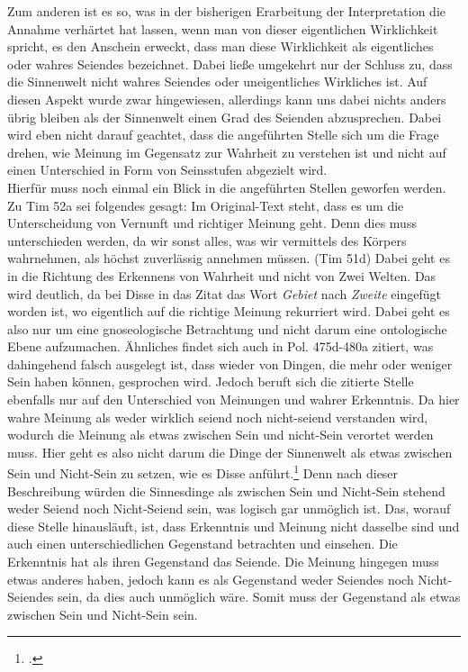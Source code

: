 Zum anderen ist es so, was in der bisherigen Erarbeitung der Interpretation die Annahme verhärtet hat lassen, wenn man von dieser eigentlichen Wirklichkeit spricht, es den Anschein erweckt, dass man diese Wirklichkeit als eigentliches oder wahres Seiendes bezeichnet. Dabei ließe umgekehrt nur der Schluss zu, dass die Sinnenwelt nicht wahres Seiendes oder uneigentliches Wirkliches ist. Auf diesen Aspekt wurde zwar hingewiesen, allerdings kann uns dabei nichts anders übrig bleiben als der Sinnenwelt einen Grad des Seienden abzusprechen. Dabei wird eben nicht darauf geachtet, dass die angeführten Stelle sich um die Frage drehen, wie Meinung im Gegensatz zur Wahrheit zu verstehen ist und nicht auf einen Unterschied in Form von Seinsstufen abgezielt wird.\\ 
Hierfür muss noch einmal ein Blick in die angeführten Stellen geworfen werden. 
Zu Tim 52a sei folgendes gesagt: Im Original-Text steht, dass es um die Unterscheidung von Vernunft und richtiger Meinung geht. Denn dies muss unterschieden werden, da wir sonst alles, was wir vermittels des Körpers wahrnehmen, als höchst zuverlässig annehmen müssen. (Tim 51d) Dabei geht es in die Richtung des Erkennens von Wahrheit und nicht von Zwei Welten. Das wird deutlich, da bei Disse in das Zitat das Wort \emph{Gebiet} nach \emph{Zweite} eingefügt worden ist, wo eigentlich auf die richtige Meinung rekurriert wird. Dabei geht es also nur um eine gnoseologische Betrachtung und nicht darum eine ontologische Ebene aufzumachen.
Ähnliches findet sich auch in Pol. 475d-480a zitiert, was dahingehend falsch ausgelegt ist, dass wieder von Dingen, die mehr oder weniger Sein haben können, gesprochen wird. Jedoch beruft sich die zitierte Stelle ebenfalls nur auf den Unterschied von Meinungen und wahrer Erkenntnis. Da hier wahre Meinung als weder wirklich seiend noch nicht-seiend verstanden wird, wodurch die Meinung als etwas zwischen Sein und nicht-Sein verortet werden muss. Hier geht es also nicht darum die Dinge der Sinnenwelt als etwas zwischen Sein und Nicht-Sein zu setzen, wie es Disse anführt.\footcite[vgl.][S. 38]{DisseMetaphysik} 
Denn nach dieser Beschreibung würden die Sinnesdinge als zwischen Sein und Nicht-Sein stehend weder Seiend noch Nicht-Seiend sein, was logisch gar unmöglich ist.   
Das, worauf diese Stelle hinausläuft, ist, dass Erkenntnis und Meinung nicht dasselbe sind und auch einen unterschiedlichen Gegenstand betrachten und einsehen. Die Erkenntnis hat als ihren Gegenstand das Seiende. Die Meinung hingegen muss etwas anderes haben, jedoch kann es als Gegenstand weder Seiendes noch Nicht-Seiendes sein, da dies auch unmöglich wäre. Somit muss der Gegenstand als etwas zwischen Sein und Nicht-Sein sein. 
